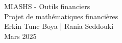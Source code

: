 \documentclass[a4paper,11pt]{article}
\begin{document}
\begin{center}
\Huge{MIASHS - Outils financiers}\\[0.5cm]
\LARGE{Projet de mathématiques financières}\\[0.2cm]
\Large{Erkin Tunc Boya | Rania Seddouki }\\
\Large{Mars 2025}
\end{center}
\end{document}
